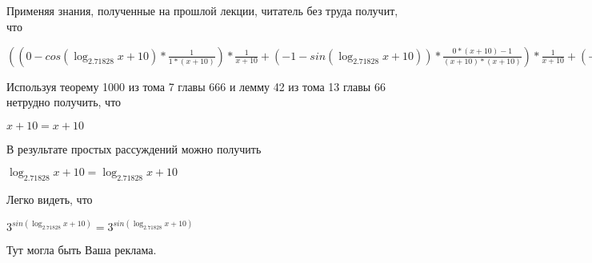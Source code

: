 \documentclass[12pt,a4paper,fleqn]{article}
\theoremstyle{definition}
\begin{document}
Применяя знания, полученные на прошлой лекции, читатель без труда получит, что 

$(( 0  - cos(\log_{ 2.71828 }{ x  +  10 }) * \frac{ 1 }{ 1  * ( x  +  10 )}
) * \frac{ 1 }{ x  +  10 }
 + ( -1  - sin(\log_{ 2.71828 }{ x  +  10 })) * \frac{ 0  * ( x  +  10 ) -  1 }{( x  +  10 ) * ( x  +  10 )}
) * \frac{ 1 }{ x  +  10 }
 + ( -1  - sin(\log_{ 2.71828 }{ x  +  10 })) * \frac{ 1 }{ x  +  10 }
 * \frac{ 0  * ( x  +  10 ) -  1 }{( x  +  10 ) * ( x  +  10 )}
 + ( -1  - sin(\log_{ 2.71828 }{ x  +  10 })) * \frac{ 1 }{ 1  * ( x  +  10 )}
 * \frac{ -2 }{( x  +  10 ) * ( x  +  10 )}
 + cos(\log_{ 2.71828 }{ x  +  10 }) * \frac{ 0  * ( x  +  10 ) * ( x  +  10 ) -  -2  * ( 1  * ( x  +  10 ) + ( x  +  10 ) *  1 )}{( x  +  10 ) * ( x  +  10 ) * ( x  +  10 ) * ( x  +  10 )}
 = (( 0  - cos(\log_{ 2.71828 }{ x  +  10 }) * \frac{ 1 }{ 1  * ( x  +  10 )}
) * \frac{ 1 }{ x  +  10 }
 + ( -1  - sin(\log_{ 2.71828 }{ x  +  10 })) * \frac{ 0  * ( x  +  10 ) -  1 }{( x  +  10 ) * ( x  +  10 )}
) * \frac{ 1 }{ x  +  10 }
 + ( -1  - sin(\log_{ 2.71828 }{ x  +  10 })) * \frac{ 1 }{ x  +  10 }
 * \frac{ 0  * ( x  +  10 ) -  1 }{( x  +  10 ) * ( x  +  10 )}
 + ( -1  - sin(\log_{ 2.71828 }{ x  +  10 })) * \frac{ 1 }{ 1  * ( x  +  10 )}
 * \frac{ -2 }{( x  +  10 ) * ( x  +  10 )}
 + cos(\log_{ 2.71828 }{ x  +  10 }) * \frac{ 0  * ( x  +  10 ) * ( x  +  10 ) -  -2  * ( 1  * ( x  +  10 ) + ( x  +  10 ) *  1 )}{( x  +  10 ) * ( x  +  10 ) * ( x  +  10 ) * ( x  +  10 )}
$

Используя теорему 1000 из тома 7 главы 666 и лемму 42 из тома 13 главы 66 нетрудно получить, что 

$ x  +  10  =  x  +  10 $

В результате простых рассуждений можно получить 

$\log_{ 2.71828 }{ x  +  10 } = \log_{ 2.71828 }{ x  +  10 }$

Легко видеть, что 

${ 3 }^{sin(\log_{ 2.71828 }{ x  +  10 })} = { 3 }^{sin(\log_{ 2.71828 }{ x  +  10 })}$

Тут могла быть Ваша реклама. 
\end{document}
